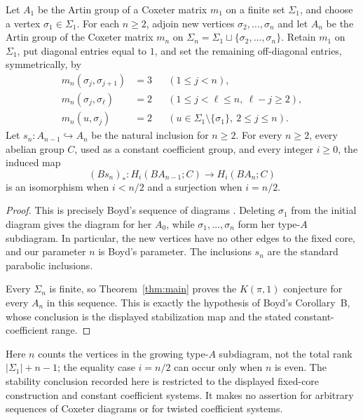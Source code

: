 \begin{corollary}
\label{cor:boyd-stability}
Let \(A_1\) be the Artin group of a Coxeter matrix \(m_1\) on a finite
set \(\Sigma_1\), and choose a vertex \(\sigma_1\in\Sigma_1\).  For each
\(n\ge2\), adjoin new vertices \(\sigma_2,\ldots,\sigma_n\) and let
\(A_n\) be the Artin group of the Coxeter matrix \(m_n\) on
\(\Sigma_n=\Sigma_1\sqcup\{\sigma_2,\ldots,\sigma_n\}\).  Retain \(m_1\)
on \(\Sigma_1\), put diagonal entries equal to \(1\), and set the
remaining off-diagonal entries, symmetrically, by
\[
\begin{aligned}
 m_n(\sigma_j,\sigma_{j+1})&=3
     &&(1\le j<n),\\
 m_n(\sigma_j,\sigma_\ell)&=2
     &&(1\le j<\ell\le n,\ \ell-j\ge2),\\
 m_n(u,\sigma_j)&=2
     &&(u\in\Sigma_1\setminus\{\sigma_1\},\ 2\le j\le n).
\end{aligned}
\]
Let \(s_n\colon A_{n-1}\hookrightarrow A_n\) be the natural inclusion
for \(n\ge2\).  For every \(n\ge2\), every abelian group \(C\), used as
a constant coefficient group, and every integer \(i\ge0\), the induced map
\[
 (Bs_n)_*\colon H_i(BA_{n-1};C)\longrightarrow H_i(BA_n;C)
\]
is an isomorphism when \(i<n/2\) and a surjection when \(i=n/2\).
\end{corollary}

\begin{proof}
This is precisely Boyd's sequence of diagrams
\cite[Introduction, Definition~6.1 and Remark~6.2]{Boyd2020}.
Deleting \(\sigma_1\) from the initial diagram gives the diagram for
her \(A_0\), while \(\sigma_1,\ldots,\sigma_n\) form her type-\(A\)
subdiagram.  In particular, the new vertices have no other edges to
the fixed core, and our parameter \(n\) is Boyd's parameter.
The inclusions \(s_n\) are the standard parabolic inclusions.

Every \(\Sigma_n\) is finite, so Theorem~\ref{thm:main} proves the
\(K(\pi,1)\) conjecture for every \(A_n\) in this sequence.  This is
exactly the hypothesis of Boyd's Corollary~B, whose conclusion is the
displayed stabilization map and the stated constant-coefficient range.
\end{proof}

Here \(n\) counts the vertices in the growing type-\(A\) subdiagram,
not the total rank \(|\Sigma_1|+n-1\); the equality case \(i=n/2\) can
occur only when \(n\) is even.  The stability conclusion recorded here
is restricted to the displayed fixed-core construction and constant
coefficient systems.  It makes no assertion for arbitrary sequences
of Coxeter diagrams or for twisted coefficient systems.
